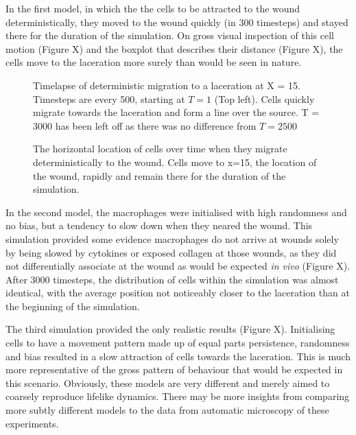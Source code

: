 \documentclass[12pt]{article}
\begin{document}
In the first model, in which the the cells to be attracted to the wound 
deterministically, they moved to the wound quickly (in 300 timesteps) 
and stayed there for the duration of the simulation. On gross visual 
inspection of this cell motion (Figure X) and the boxplot that describes 
their distance (Figure X), the cells move to the laceration more surely 
than would be seen in nature.

\begin{figure}[H]
\centering
\caption{Timelapse of deterministic 
migration to a laceration at X = 15. Timesteps are every 500, starting 
at \(T = 1\) (Top left). Cells quickly migrate towards the laceration and 
form a line over the source. T = 3000 has been left off as there was no 
difference from \(T = 2500\)}
\end{figure}

\begin{figure}[H]
\centering
\caption{The horizontal location of cells over time when 
they migrate deterministically to the wound. Cells move to x=15, the 
location of the wound, rapidly and remain there for the duration of the 
simulation.
}
\end{figure}

In the second model, the macrophages were initialised with high 
randomness and no bias, but a tendency to slow down when they neared the 
wound. This simulation provided some evidence macrophages do not arrive 
at wounds solely by being slowed by cytokines or exposed collagen at 
those wounds, as they did not differentially associate at the wound as 
would be expected {\itshape in vivo} (Figure X). After 3000 timesteps, 
the distribution of cells within the simulation was almost identical, 
with the average position not noticeably closer to the laceration than 
at the beginning of the simulation.\begin{figure}[H]
\centering
\end{figure}

The third simulation provided the only realistic results (Figure X). 
Initialising cells to have a movement pattern made up of equal parts 
persistence, randomness and bias resulted in a slow attraction of cells 
towards the laceration. This is much more representative of the gross 
pattern of behaviour that would be expected in this scenario. Obviously, 
these models are very different and merely aimed to coarsely reproduce 
lifelike dynamics. There may be more insights from comparing more subtly 
different models to the data from automatic microscopy of these 
experiments.
\end{document}

